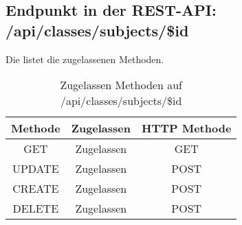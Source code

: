 \subsection{Endpunkt in der REST-API: /api/classes/subjects/\$id}
Die  listet die zugelassenen Methoden. 

\begin{table}[!htbp]
	\begin{tabular}{|c|c|c|}
		\hline
			\textbf{Methode} & \textbf{Zugelassen} & \textbf{HTTP Methode} \\ \hline
			GET & Zugelassen & GET \\ \hline
			UPDATE & Zugelassen & POST \\ \hline 
			CREATE & Zugelassen & POST \\ \hline 
			DELETE & Zugelassen & POST \\ \hline
	\end{tabular}

		\caption{Zugelassen Methoden auf /api/classes/subjects/\$id}
		\label{tab:end:rest:api:classes:subjects:id:meth}
\end{table}